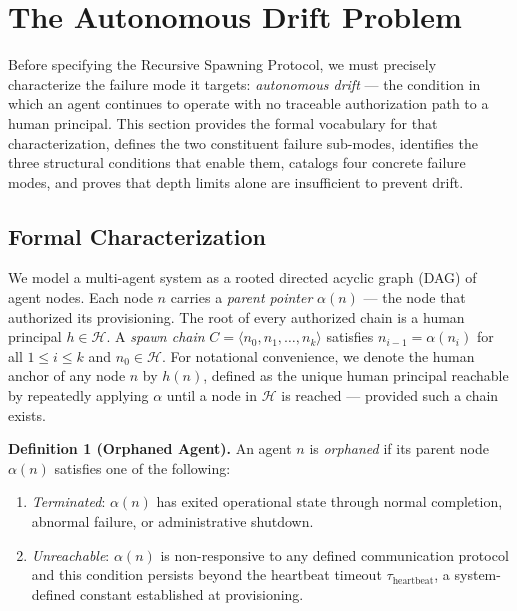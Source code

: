 \section{The Autonomous Drift Problem}
\label{sec:rs-drift}

Before specifying the Recursive Spawning Protocol, we must precisely characterize the failure mode it targets: \emph{autonomous drift} — the condition in which an agent continues to operate with no traceable authorization path to a human principal. This section provides the formal vocabulary for that characterization, defines the two constituent failure sub-modes, identifies the three structural conditions that enable them, catalogs four concrete failure modes, and proves that depth limits alone are insufficient to prevent drift.

\subsection{Formal Characterization}
\label{sec:rs-drift-formal}

We model a multi-agent system as a rooted directed acyclic graph (DAG) of agent nodes. Each node $n$ carries a \emph{parent pointer} $\alpha(n)$ — the node that authorized its provisioning. The root of every authorized chain is a human principal $h \in \mathcal{H}$. A \emph{spawn chain} $C = \langle n_0, n_1, \ldots, n_k \rangle$ satisfies $n_{i-1} = \alpha(n_i)$ for all $1 \leq i \leq k$ and $n_0 \in \mathcal{H}$. For notational convenience, we denote the human anchor of any node $n$ by $h(n)$, defined as the unique human principal reachable by repeatedly applying $\alpha$ until a node in $\mathcal{H}$ is reached — provided such a chain exists.

\medskip
\noindent\textbf{Definition 1 (Orphaned Agent).}
An agent $n$ is \emph{orphaned} if its parent node $\alpha(n)$ satisfies one of the following:

\begin{enumerate}
  \item[(a)] \emph{Terminated}: $\alpha(n)$ has exited operational state through normal completion, abnormal failure, or administrative shutdown.
  \item[(b)] \emph{Unreachable}: $\alpha(n)$ is non-responsive to any defined communication protocol and this condition persists beyond the heartbeat timeout $\tau_{\mathrm{heartbeat}}$, a system-defined constant established at provisioning.
\end{enumerate}


